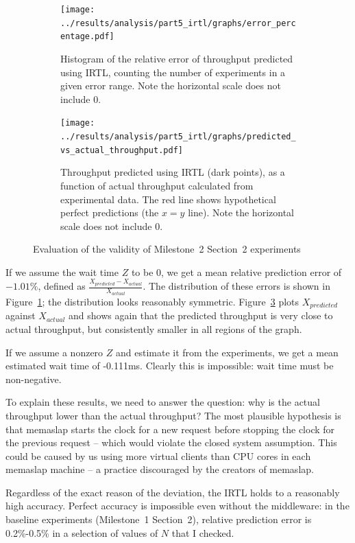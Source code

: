 \documentclass[11pt]{article}
\begin{document}
\begin{figure}[h]
\centering
\begin{subfigure}[t]{0.49\textwidth}
\texttt{[image: ../results/analysis/part5\_irtl/graphs/error\_percentage.pdf]}
\caption{Histogram of the relative error of throughput predicted using IRTL, counting the number of experiments in a given error range. Note the horizontal scale does not include 0.}
\label{fig:part5:error_percentage}
\end{subfigure}
\begin{subfigure}[t]{0.49\textwidth}
\texttt{[image: ../results/analysis/part5\_irtl/graphs/predicted\_vs\_actual\_throughput.pdf]}
\caption{Throughput predicted using IRTL (dark points), as a function of actual throughput calculated from experimental data. The red line shows hypothetical perfect predictions (the $x=y$ line). Note the horizontal scale does not include 0.}
\label{fig:part5:predicted_vs_actual}
\end{subfigure}
\caption{Evaluation of the validity of Milestone~2 Section~2 experiments}
\end{figure}

If we assume the wait time $Z$ to be 0, we get a mean relative prediction error of $-1.01\%$, defined as $\frac{X_{predicted}-X_{actual}}{X_{actual}}$. The distribution of these errors is shown in Figure~\ref{fig:part5:error_percentage}; the distribution looks reasonably symmetric. Figure~\ref{fig:part5:predicted_vs_actual} plots $X_{predicted}$ against $X_{actual}$ and shows again that the predicted throughput is very close to actual throughput, but consistently smaller in all regions of the graph.

If we assume a nonzero $Z$ and estimate it from the experiments, we get a mean estimated wait time of -0.111ms. Clearly this is impossible: wait time must be non-negative.

To explain these results, we need to answer the question: why is the actual throughput lower than the actual throughput? The most plausible hypothesis is that memaslap starts the clock for a new request before stopping the clock for the previous request -- which would violate the closed system assumption. This could be caused by us using more virtual clients than CPU cores in each memaslap machine -- a practice discouraged by the creators of memaslap.

Regardless of the exact reason of the deviation, the IRTL holds to a reasonably high accuracy. Perfect accuracy is impossible even without the middleware: in the baseline experiments (Milestone~1 Section~2), relative prediction error is 0.2\%-0.5\% in a selection of values of $N$ that I checked.
\end{document}
